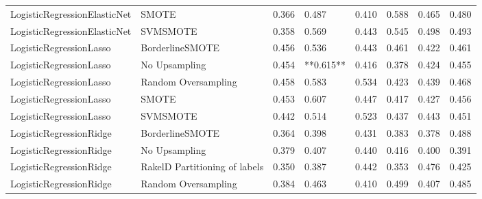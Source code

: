 \begin{tabular}{llllllll}
   LogisticRegressionElasticNet &                         SMOTE & 0.366 &                     0.487 &                 0.410 &                  0.588 &                                   0.465 &    0.480 \\
   LogisticRegressionElasticNet &                      SVMSMOTE & 0.358 &                     0.569 &                 0.443 &                  0.545 &                                   0.498 &    0.493 \\
        LogisticRegressionLasso &               BorderlineSMOTE & 0.456 &                     0.536 &                 0.443 &                  0.461 &                                   0.422 &    0.461 \\
        LogisticRegressionLasso &                 No Upsampling & 0.454 &                 **0.615** &                 0.416 &                  0.378 &                                   0.424 &    0.455 \\
        LogisticRegressionLasso &           Random Oversampling & 0.458 &                     0.583 &                 0.534 &                  0.423 &                                   0.439 &    0.468 \\
        LogisticRegressionLasso &                         SMOTE & 0.453 &                     0.607 &                 0.447 &                  0.417 &                                   0.427 &    0.456 \\
        LogisticRegressionLasso &                      SVMSMOTE & 0.442 &                     0.514 &                 0.523 &                  0.437 &                                   0.443 &    0.451 \\
        LogisticRegressionRidge &               BorderlineSMOTE & 0.364 &                     0.398 &                 0.431 &                  0.383 &                                   0.378 &    0.488 \\
        LogisticRegressionRidge &                 No Upsampling & 0.379 &                     0.407 &                 0.440 &                  0.416 &                                   0.400 &    0.391 \\
        LogisticRegressionRidge & RakelD Partitioning of labels & 0.350 &                     0.387 &                 0.442 &                  0.353 &                                   0.476 &    0.425 \\
        LogisticRegressionRidge &           Random Oversampling & 0.384 &                     0.463 &                 0.410 &                  0.499 &                                   0.407 &    0.485 \\

\end{tabular}
